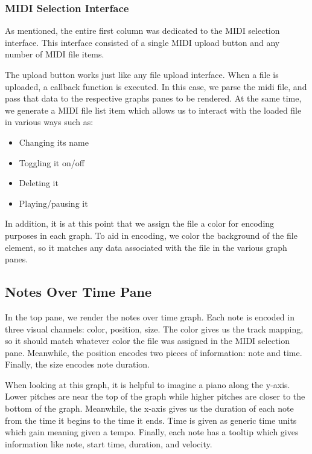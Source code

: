 \documentclass[journal]{vgtc}                %
\begin{document}
\subsubsection{MIDI Selection Interface}

As mentioned, the entire first column was dedicated to the MIDI selection
interface. This interface consisted of a single MIDI upload button and any
number of MIDI file items.

The upload button works just like any file upload interface. When a file is
uploaded, a callback function is executed. In this case, we parse the midi file,
and pass that data to the respective graphs panes to be rendered. At the same
time, we generate a MIDI file list item which allows us to interact with the
loaded file in various ways such as:

\begin{itemize}
  \item Changing its name
  \item Toggling it on/off
  \item Deleting it
  \item Playing/pausing it
\end{itemize}

In addition, it is at this point that we assign the file a color for encoding
purposes in each graph. To aid in encoding, we color the background of the
file element, so it matches any data associated with the file in the various
graph panes.

\subsection{Notes Over Time Pane}

In the top pane, we render the notes over time graph. Each note is encoded in
three visual channels: color, position, size. The color gives us the track
mapping, so it should match whatever color the file was assigned in the MIDI
selection pane. Meanwhile, the position encodes two pieces of information:
note and time. Finally, the size encodes note duration.

When looking at this graph, it is helpful to imagine a piano along the y-axis.
Lower pitches are near the top of the graph while higher pitches are closer to the
bottom of the graph. Meanwhile, the x-axis gives us the duration of each note
from the time it begins to the time it ends. Time is given as generic time units
which gain meaning given a tempo. Finally, each note has a tooltip which gives
information like note, start time, duration, and velocity.
\end{document}
